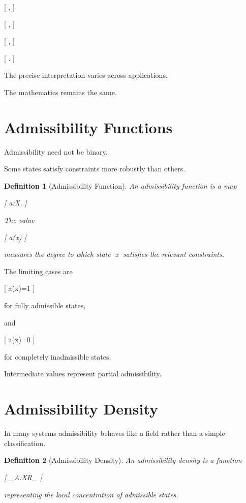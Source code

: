 \documentclass[11pt,oneside,openany]{book}
\newtheorem{definition}{Definition}[chapter] \newtheorem{theorem}{Theorem}[chapter] \newtheorem{proposition}{Proposition}[chapter] \newtheorem{lemma}{Lemma}[chapter] \newtheorem{corollary}{Corollary}[chapter] \newtheorem{remark}{Remark}[chapter]
\begin{document}
[
,
]

[
,
]

[
,
]

[
.
]

The precise interpretation varies across applications.

The mathematics remains the same.

\section{Admissibility Functions}

Admissibility need not be binary.

Some states satisfy constraints more robustly than others.

\begin{definition}[Admissibility Function]

An admissibility function is a map

[
a:X\rightarrow [0,1].
]

The value

[
a(x)
]

measures the degree to which state x satisfies the relevant constraints.

\end{definition}

The limiting cases are

[
a(x)=1
]

for fully admissible states,

and

[
a(x)=0
]

for completely inadmissible states.

Intermediate values represent partial admissibility.

\section{Admissibility Density}

In many systems admissibility behaves like a field rather than a simple classification.

\begin{definition}[Admissibility Density]

An admissibility density is a function

[
\rho_A:X\rightarrow \mathbb R_{}
]

representing the local concentration of admissible states.

\end{definition}
\end{document}
